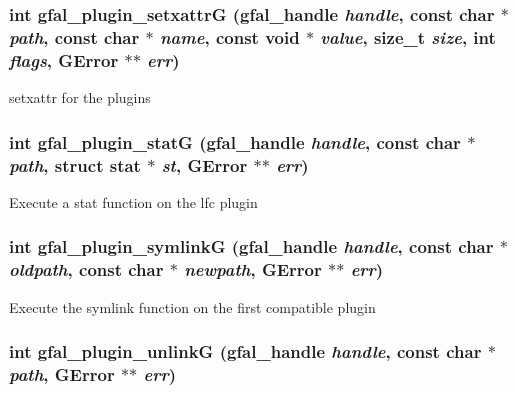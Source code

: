 \subsubsection{\setlength{\rightskip}{0pt plus 5cm}int gfal\_\-plugin\_\-setxattr\-G (gfal\_\-handle {\em handle}, const char $\ast$ {\em path}, const char $\ast$ {\em name}, const void $\ast$ {\em value}, size\_\-t {\em size}, int {\em flags}, GError $\ast$$\ast$ {\em err})}\label{gfal__common__plugin_8h_f416447f5b15d199a28ca58b16807847}


setxattr for the plugins 
\subsubsection{\setlength{\rightskip}{0pt plus 5cm}int gfal\_\-plugin\_\-stat\-G (gfal\_\-handle {\em handle}, const char $\ast$ {\em path}, struct stat $\ast$ {\em st}, GError $\ast$$\ast$ {\em err})}\label{gfal__common__plugin_8h_98b9e43ecd18ce2fc728d4a731e52ce1}


Execute a stat function on the lfc plugin 
\subsubsection{\setlength{\rightskip}{0pt plus 5cm}int gfal\_\-plugin\_\-symlink\-G (gfal\_\-handle {\em handle}, const char $\ast$ {\em oldpath}, const char $\ast$ {\em newpath}, GError $\ast$$\ast$ {\em err})}\label{gfal__common__plugin_8h_6ff9d39b564be7d0a560a09288e19b9e}


Execute the symlink function on the first compatible plugin 
\subsubsection{\setlength{\rightskip}{0pt plus 5cm}int gfal\_\-plugin\_\-unlink\-G (gfal\_\-handle {\em handle}, const char $\ast$ {\em path}, GError $\ast$$\ast$ {\em err})}\label{gfal__common__plugin_8h_1a4632c68c7d81f87071733081900dee}


